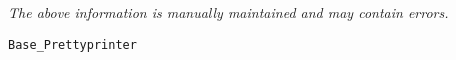 \label{pkg:base\_prettyprinter}

{\tiny \it The above information is manually maintained and may contain errors.}
\begin{verbatim}
Base_Prettyprinter
\end{verbatim}
